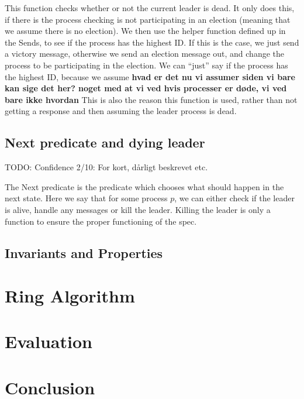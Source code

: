 \documentclass{article}
\begin{document}
This function checks whether or not the current leader is dead. It only does this, if there is the process checking is not participating in an election (meaning that we assume there is no election). We then use the helper function defined up in the Sends, to see if the process has the highest ID. If this is the case, we just send a victory message, otherwise we send an election message out, and change the process to be participating in the election.
We can ``just'' say if the process has the highest ID, because we assume \textbf{hvad er det nu vi assumer siden vi bare kan sige det her? noget med at vi ved hvis processer er døde, vi ved bare ikke hvordan}
This is also the reason this function is used, rather than not getting a response and then assuming the leader process is dead.

\subsection{Next predicate and dying leader}
TODO: Confidence 2/10: For kort, dårligt beskrevet etc.

\noindent{}


The Next predicate is the predicate which chooses what should happen in the next state. Here we say that for some process $p$, we can either check if the leader is alive, handle any messages or kill the leader. Killing the leader is only a function to ensure the proper functioning of the spec.

\subsection{Invariants and Properties}



\section{Ring Algorithm}

\lipsum[1]

\section{Evaluation}

\lipsum[2]

\section{Conclusion}

\lipsum[3]
\end{document}
